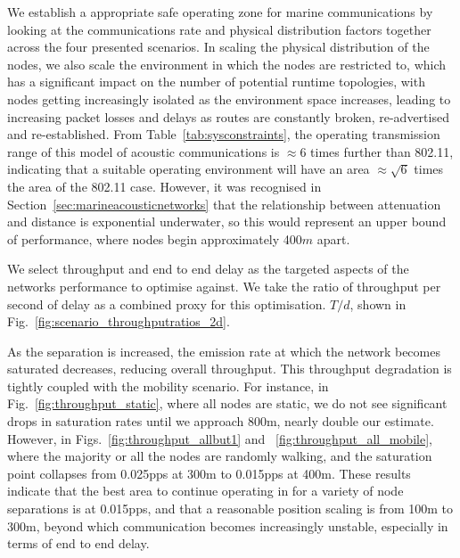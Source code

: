 \documentclass[runningheads,a4paper]{llncs}
\begin{document}
We establish a appropriate safe operating zone for marine communications by looking at the communications rate and physical distribution factors together across the four presented scenarios.
In scaling the physical distribution of the nodes, we also scale the environment in which the nodes are restricted to, which has a significant impact on the number of potential runtime topologies, with nodes getting increasingly isolated as the environment space increases, leading to increasing packet losses and delays as routes are constantly broken, re-advertised and re-established. 
From Table~\ref{tab:sysconstraints}, the operating transmission range of this model of acoustic communications is $\approx 6$ times further than 802.11, indicating that a suitable operating environment will have an area $\approx \sqrt{6}$ times the area of the 802.11 case.
However, it was recognised in Section~\ref{sec:marineacousticnetworks} that the relationship between attenuation and distance is exponential underwater, so this would represent an upper bound of performance, where nodes begin approximately 400$m$ apart. 

We select throughput and end to end delay as the targeted aspects of the networks performance to optimise against.
We take the ratio of throughput per second of delay as a combined proxy for this optimisation. $T/d$, shown in Fig.~\ref{fig:scenario_throughputratios_2d}.

As the separation is increased, the emission rate at which the network becomes saturated decreases, reducing overall throughput. 
This throughput degradation is tightly coupled with the mobility scenario.
For instance, in Fig.~\ref{fig:throughput_static}, where all nodes are static, we do not see significant drops in saturation rates until we approach 800m, nearly double our estimate. 
However, in Figs.~\ref{fig:throughput_allbut1} and ~\ref{fig:throughput_all_mobile}, where the majority or all the nodes are randomly walking, and the saturation point collapses from 0.025pps at 300m to 0.015pps at 400m.
These results indicate that the best area to continue operating in for a variety of node separations is at 0.015pps, and that a reasonable position scaling is from 100m to 300m, beyond which communication becomes increasingly unstable, especially in terms of end to end delay.
\end{document}

